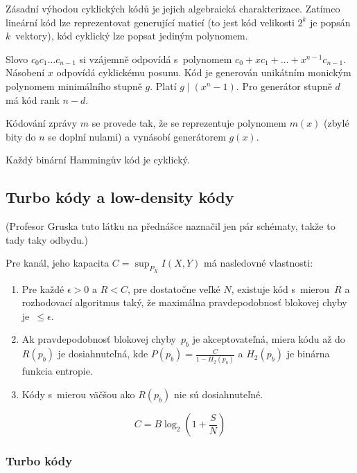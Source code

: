 Zásadní výhodou cyklických kódů je jejich algebraická charakterizace.
Zatímco lineární kód lze reprezentovat generující maticí (to jest kód
velikosti $2^k$ je popsán $k$~vektory), kód cyklický lze popsat
jediným polynomem.

Slovo $c_0c_1 \ldots c_{n-1}$ si vzájemně odpovídá s~polynomem
$c_0 + x c_1 + \ldots + x^{n-1} c_{n-1}$. Násobení $x$ odpovídá
cyklickému posunu. Kód je generován unikátním monickým polynomem
minimálního stupně $g$. Platí $g \mid (x^n - 1)$.
Pro generátor stupně $d$ má kód rank $n - d$.

Kódování zprávy $m$ se provede tak, že se reprezentuje polynomem $m(x)$
(zbylé bity do $n$ se doplní nulami)
a vynásobí generátorem $g(x)$.

Každý binární Hammingův kód je cyklický.

\pagebreak

\subsection{Turbo kódy a low-density kódy}

(Profesor Gruska tuto látku na přednášce naznačil jen pár schématy, takže
to tady taky odbydu.)

\begin{theorem}[Shannon]
	Pre kanál, jeho kapacita $C=\sup_{P_X}I(X,Y)$ má nasledovné vlastnosti:
	\begin{enumerate}
		\item Pre každé $\epsilon > 0$ a $R < C$, pre dostatočne veľké $N$, existuje
		kód s~mierou~$R$ a rozhodovací algoritmus taký, že maximálna pravdepodobnosť
		blokovej chyby je~$\leq \epsilon$.
		\item Ak pravdepodobnosť blokovej chyby~$p_b$ je akceptovateľná, miera
		kódu až do $R(p_b)$ je dosiahnuteľná, kde $P(p_b)=\frac{C}{1-H_2(p_b)}$ a
		$H_2(p_b)$ je binárna funkcia entropie.
		\item Kódy s~mierou väčšou ako $R(p_b)$ nie sú dosiahnuteľné.
	\end{enumerate}
\end{theorem}

\begin{theorem}[Shannon]
	\[ 
		C = B \log_2\left(1+\frac{S}{N}\right)
	\]
\end{theorem}

\subsubsection{Turbo kódy}

